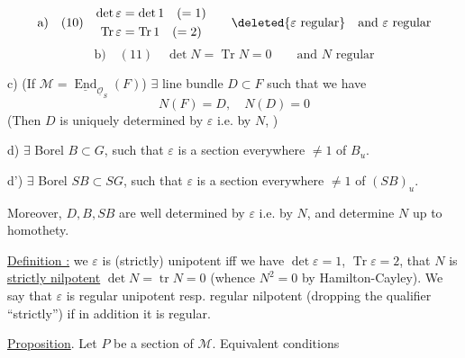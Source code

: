\[
\text{a)}\quad (10)\quad
\begin{gathered}
\det\varepsilon=\det1\quad(=1)\\
\operatorname{Tr}\varepsilon=\operatorname{Tr}1\quad(=2)
\end{gathered}
\qquad \deleted{\varepsilon\text{ regular}}\quad\text{and }\varepsilon\text{ regular}
\]
\[
\text{b)}\quad (11)\quad \det N=\operatorname{Tr}N=0\qquad\text{and }N\text{ regular}
\]

c) (If $\mathcal M=\underline{\operatorname{End}}_{\underline{\mathcal O}_S}(F)$) $\exists$ line bundle $D\subset F$ such that we have
\[
N(F)=D,\quad N(D)=0
\]
(Then $D$ is uniquely determined by $\varepsilon$ i.e. by $N$,  )


d) $\exists$ Borel $B\subset G$, such that $\varepsilon$ is a section everywhere $\ne1$ of $B_u$.

d') $\exists$ Borel $SB\subset SG$, such that $\varepsilon$ is a section everywhere $\ne1$ of $(SB)_u$.

 Moreover, $D,B,SB$ are well determined by $\varepsilon$ i.e. by $N$, and determine $N$ up to homothety.

\uline{Definition :} we   $\varepsilon$ is (strictly) unipotent iff we have $\det\varepsilon=1$, $\operatorname{Tr}\varepsilon=2$, that $N$ is \uline{strictly nilpotent}  $\det N=\operatorname{tr}N=0$ (whence $N^2=0$ by Hamilton-Cayley). We say that $\varepsilon$ is regular unipotent resp. regular nilpotent (dropping the qualifier ``strictly'') if in addition it is regular.



\uline{Proposition}. Let $P$ be a section of $\mathcal M$. Equivalent conditions

